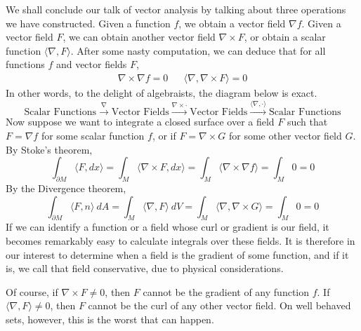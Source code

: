 We shall conclude our talk of vector analysis by talking about three operations we have constructed. Given a function $f$, we obtain a vector field $\nabla f$. Given a vector field $F$, we can obtain another vector field $\nabla \times F$, or obtain a scalar function $\langle \nabla, F \rangle$. After some nasty computation, we can deduce that for all functions $f$ and vector fields $F$,
%
\begin{align*}
    \nabla \times \nabla f = 0 && \langle \nabla, \nabla \times F \rangle = 0
\end{align*}
%
In other words, to the delight of algebraists, the diagram below is exact.
%
\[ \text{Scalar Functions} \xrightarrow{\nabla} \text{Vector Fields} \xrightarrow{\nabla \times \cdot} \text{Vector Fields} \xrightarrow{\langle \nabla, \cdot \rangle} \text{Scalar Functions} \]
%
Now suppose we want to integrate a closed surface over a field $F$ such that $F = \nabla f$ for some scalar function $f$, or if $F = \nabla \times G$ for some other vector field $G$. By Stoke's theorem,
%
\[ \int_{\partial M} \langle F, dx \rangle = \int_M \langle \nabla \times F, dx \rangle = \int_M \langle \nabla \times \nabla f \rangle = \int_M 0 = 0 \]
%
By the Divergence theorem,
%
\[ \int_{\partial M} \langle F, n \rangle\ dA = \int_M \langle \nabla, F \rangle\ dV = \int_M \langle \nabla, \nabla \times G \rangle = \int_M 0 = 0 \]
%
If we can identify a function or a field whose curl or gradient is our field, it becomes remarkably easy to calculate integrals over these fields. It is therefore in our interest to determine when a field is the gradient of some function, and if it is, we call that field conservative, due to physical considerations.

Of course, if $\nabla \times F \neq 0$, then $F$ cannot be the gradient of any function $f$. If $\langle \nabla, F \rangle \neq 0$, then $F$ cannot be the curl of any other vector field. On well behaved sets, however, this is the worst that can happen.

